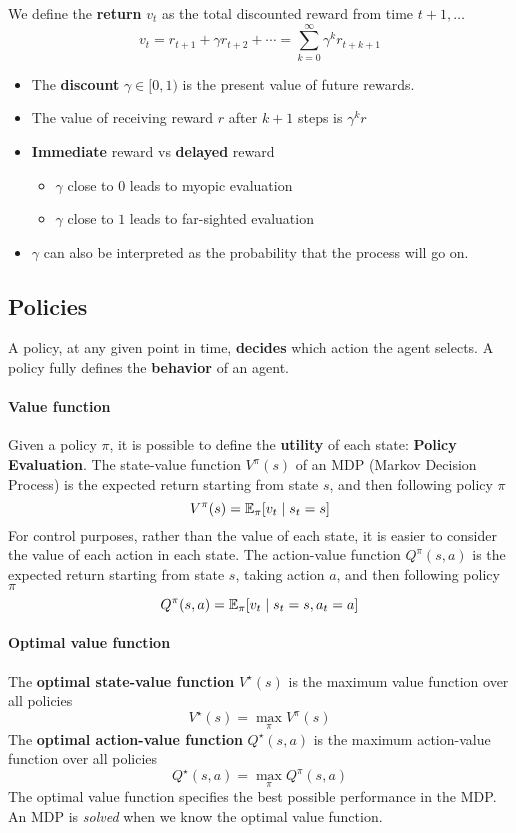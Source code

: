 We define the \textbf{return} $v_{t}$ as the total discounted reward from time $t+1,\ldots$
\[
    v_{t} = r_{t+1} + \gamma r_{t+2} + \cdots = \sum_{k=0}^{\infty} \gamma ^{k} r_{t+k+1}   
\]
\begin{itemize}
    \item The \textbf{discount} $\gamma \in [0,1)$ is the present value of future rewards.
    \item The value of receiving reward $r$ after $k+1$ steps is $\gamma ^{k}r $
    \item \textbf{Immediate} reward vs \textbf{delayed} reward
    \begin{itemize}
        \item $\gamma $ close to $0$ leads to myopic evaluation
        \item $\gamma $ close to $1$ leads to far-sighted evaluation
    \end{itemize}
    \item $\gamma $ can also be interpreted as the probability that the process will go on.
\end{itemize}

\subsection{Policies}

A policy, at any given point in time, \textbf{decides} which action the agent selects. A policy fully defines the \textbf{behavior} of an agent.

\paragraph{Value function} Given a policy $\pi $, it is possible to define the \textbf{utility} of each state: \textbf{Policy Evaluation}. The state-value function $V^{\pi }(s) $ of an MDP (Markov Decision Process) is the expected return starting from state $s$, and then following policy $\pi $
\[
    V^{\pi }(s) = \mathbb{E}_{\pi }[v_{t}\mid s_{t}=s] 
\]
For control purposes, rather than the value of each state, it is easier to consider the value of each action in each state. The action-value function $Q^{\pi }(s,a) $ is the expected return starting from state $s$, taking action $a$, and then following policy $\pi $
\[
    Q^{\pi }(s,a) = \mathbb{E}_{\pi }[v_{t} \mid s_{t}=s,a_{t}=a] 
\]

\paragraph{Optimal value function} The \textbf{optimal state-value function} $V^{\star}(s) $ is the maximum value function over all policies
\[
    V^{\star}(s) = \max_{\pi }V^{\pi }(s)  
\]
The \textbf{optimal action-value function} $Q^{\star}(s,a) $ is the maximum action-value function over all policies
\[
    Q^{\star}(s,a) = \max_{\pi }Q^{\pi }(s,a)
\]
The optimal value function specifies the best possible performance in the MDP. An MDP is \emph{solved} when we know the optimal value function.

